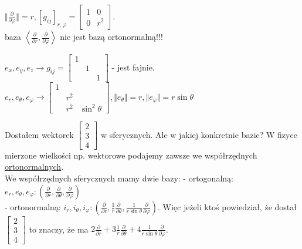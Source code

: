 \documentclass[../main.tex]{subfiles}
\begin{document}
    $\Vert \frac{\partial }{\partial \varphi}  \Vert = r,  \left[ g_{ij} \right]_{r,\varphi} = \begin{bmatrix} 1&0\\0&r^2 \end{bmatrix}$. \\
baza $\left<\frac{\partial }{\partial r} , \frac{\partial }{\partial \varphi}  \right>$ nie jest bazą ortonormalną!!!

$e_x,e_y,e_z \to g_{ij} = \begin{bmatrix} 1&&\\&1&\\&&1 \end{bmatrix} $ - jest fajnie.\\
$e_r,e_\theta,e_\varphi \to \begin{bmatrix} 1&&\\&r^2&\\&r^2&\sin^2\theta \end{bmatrix}, \Vert e_\theta \Vert = r, \Vert e_\varphi \Vert = r\sin\theta $
\begin{przyklad}
    Dostałem wektorek $\begin{bmatrix} 2\\3\\4 \end{bmatrix} $ w sferycznych. Ale w jakiej konkretnie bazie?
W fizyce mierzone wielkości np. wektorowe podajemy zawsze we współrzędnych \underline{ortonormalnych}.\\
We współrzędnych sferycznych mamy dwie bazy:
- ortogonalną: $e_r, e_\theta, e_\varphi: \left( \frac{\partial }{\partial r} , \frac{\partial }{\partial \theta} , \frac{\partial }{\partial \varphi}  \right) $ \\
- ortonormalną: $i_r, i_\theta, i_\varphi: \left( \frac{\partial }{\partial r} , \frac{1}{r}\frac{\partial }{\partial \theta} , \frac{1}{r\sin\theta}\frac{\partial }{\partial \varphi}  \right) $.
Więc jeżeli ktoś powiedział, że dostał $\begin{bmatrix} 2\\3\\4 \end{bmatrix} $ to znaczy, że ma $2 \frac{\partial }{\partial r} + 3 \frac{1}{r} \frac{\partial }{\partial \theta} + 4 \frac{1}{r\sin\theta} \frac{\partial }{\partial \varphi} $.
\end{przyklad}
\end{document}
